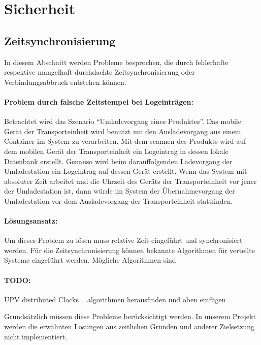 \section{Sicherheit}

\subsection{Zeitsynchronisierung}

In diesem Abschnitt werden Probleme besprochen, die durch fehlerhafte respektive
mangelhaft durchdachte Zeitsynchronisierung oder Verbindungsabbruch entstehen
können.


\paragraph{Problem durch falsche Zeitstempel bei Logeinträgen:}
Betrachtet wird das Szenario ``Umladevorgang eines Produktes''. Das mobile
Gerät der Transporteinheit wird benutzt um den Ausladevorgang aus einem
Container im System zu verarbeiten. Mit dem scannen des Produkts wird auf dem
mobilen Gerät der Transporteinheit ein Logeintrag in dessen lokale Datenbank
erstellt. Genauso wird beim darauffolgenden Ladevorgang der Umladestation ein
Logeintrag auf dessen Gerät erstellt. Wenn das System mit absoluter Zeit
arbeitet und die Uhrzeit des Geräts der Transporteinheit vor jener der
Umladestation ist, dann würde im System der Übernahmevorgang der Umladestation
vor dem Ausladevorgang der Transporteinheit stattfinden.
\par
\paragraph{Lösungsansatz:}
Um dieses Problem zu lösen muss relative Zeit eingeführt und synchronisiert
werden. Für die Zeitsynchronisierung können bekannte Algorithmen für verteilte
Systeme eingeführt werden. Mögliche Algorithmen sind
\par

\paragraph{TODO:}
UPV distributed Clocks .. algorithmen herausfinden und oben einfügen\\ 
\par

Grundsätzlich müssen diese Probleme berücksichtigt werden. In unserem
Projekt werden die erwähnten Lösungen aus zeitlichen Gründen und anderer
Zielsetzung nicht implementiert.
